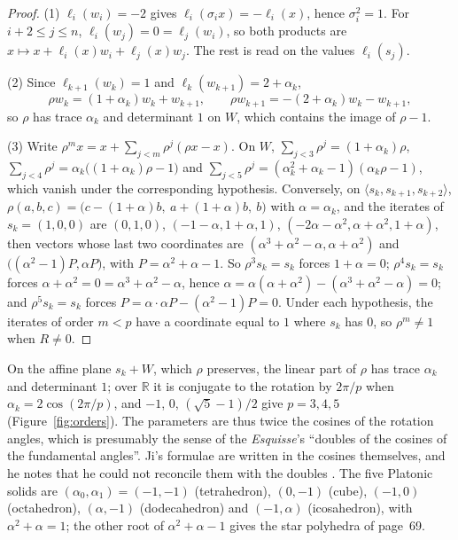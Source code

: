 \documentclass[11pt,a4paper]{amsart}
\theoremstyle{definition}
\theoremstyle{remark}
\newcommand{\R}{\mathbb R}
\begin{document}
\begin{proof}
(1) $\ell_i(w_i) = -2$ gives $\ell_i(\sigma_ix) = -\ell_i(x)$, hence $\sigma_i^2 = 1$. For $i + 2 \le j \le n$, $\ell_i(w_j) = 0 = \ell_j(w_i)$, so both products are $x \mapsto x + \ell_i(x)w_i + \ell_j(x)w_j$. The rest is read on the values $\ell_i(s_j)$.

(2) Since $\ell_{k+1}(w_k) = 1$ and $\ell_k(w_{k+1}) = 2 + \alpha_k$,
\[
\rho w_k = (1 + \alpha_k)w_k + w_{k+1}, \qquad \rho w_{k+1} = -(2 + \alpha_k)w_k - w_{k+1},
\]
so $\rho$ has trace $\alpha_k$ and determinant $1$ on $W$, which contains the image of $\rho - 1$.

(3) Write $\rho^m x = x + \sum_{j<m}\rho^j(\rho x - x)$. On $W$, $\sum_{j<3}\rho^j = (1 + \alpha_k)\rho$, $\sum_{j<4}\rho^j = \alpha_k\bigl((1 + \alpha_k)\rho - 1\bigr)$ and $\sum_{j<5}\rho^j = (\alpha_k^2 + \alpha_k - 1)(\alpha_k\rho - 1)$, which vanish under the corresponding hypothesis. Conversely, on $\langle s_k, s_{k+1}, s_{k+2}\rangle$, $\rho(a,b,c) = \bigl(c - (1+\alpha)b,\ a + (1+\alpha)b,\ b\bigr)$ with $\alpha = \alpha_k$, and the iterates of $s_k = (1,0,0)$ are $(0,1,0)$, $(-1-\alpha, 1+\alpha, 1)$, $(-2\alpha - \alpha^2, \alpha + \alpha^2, 1 + \alpha)$, then vectors whose last two coordinates are $(\alpha^3 + \alpha^2 - \alpha, \alpha + \alpha^2)$ and $\bigl((\alpha^2 - 1)P, \alpha P\bigr)$, with $P = \alpha^2 + \alpha - 1$. So $\rho^3s_k = s_k$ forces $1 + \alpha = 0$; $\rho^4s_k = s_k$ forces $\alpha + \alpha^2 = 0 = \alpha^3 + \alpha^2 - \alpha$, hence $\alpha = \alpha(\alpha + \alpha^2) - (\alpha^3 + \alpha^2 - \alpha) = 0$; and $\rho^5s_k = s_k$ forces $P = \alpha\cdot\alpha P - (\alpha^2 - 1)P = 0$. Under each hypothesis, the iterates of order $m < p$ have a coordinate equal to $1$ where $s_k$ has $0$, so $\rho^m \ne 1$ when $R \ne 0$.
\end{proof}

On the affine plane $s_k + W$, which $\rho$ preserves, the linear part of $\rho$ has trace $\alpha_k$ and determinant $1$; over $\R$ it is conjugate to the rotation by $2\pi/p$ when $\alpha_k = 2\cos(2\pi/p)$, and $-1$, $0$, $(\sqrt5 - 1)/2$ give $p = 3, 4, 5$ (Figure~\ref{fig:orders}). The parameters are thus twice the cosines of the rotation angles, which is presumably the sense of the \emph{Esquisse}'s ``doubles of the cosines of the fundamental angles''. Ji's formulae are written in the cosines themselves, and he notes that he could not reconcile them with the doubles \cite[\S2]{ji2023}. The five Platonic solids are $(\alpha_0, \alpha_1) = (-1,-1)$ (tetrahedron), $(0,-1)$ (cube), $(-1,0)$ (octahedron), $(\alpha,-1)$ (dodecahedron) and $(-1,\alpha)$ (icosahedron), with $\alpha^2 + \alpha = 1$; the other root of $\alpha^2 + \alpha - 1$ gives the star polyhedra of page~69.
\end{document}
